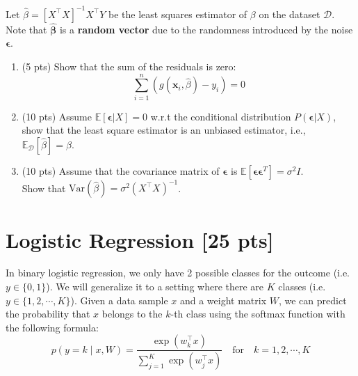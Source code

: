 \documentclass[11pt]{article}
\renewcommand{\vec}[1]{\mathbf{#1}}
\begin{document}
Let $\hat{\beta}=[X^\top X]^{-1}X^\top Y$ be the least squares estimator of $\beta$ on the dataset $\mathcal{D}$. Note that $\hat{\vec{\beta}}$ is a \textbf{random vector} due to the randomness introduced by the noise $\boldsymbol{\epsilon}$.
\begin{enumerate}
\item (5 pts) Show that the sum of the residuals is zero:
\[\sum_{i=1}^n(g(\mathbf{x}_i, \hat{\beta}) -y_i)=0\]

\begin{answertext}{6cm}{}

\end{answertext} 
\pagebreak
\item (10 pts)  Assume  $\mathbb{E}[\boldsymbol{\epsilon}|X]=0$ w.r.t the conditional distribution $P(\boldsymbol{\epsilon}|X)$, show that the least square estimator is an unbiased estimator, i.e., $\mathbb{E}_{\mathcal{D}}[\hat{\beta}]=\beta$.

\begin{answertext}{9cm}{}

\end{answertext} 
\item (10 pts) Assume that the covariance matrix of $\boldsymbol{\epsilon}$ is $\mathbb{E}\left[\boldsymbol{\epsilon} \boldsymbol{\epsilon}^T\right]=\sigma^2 I$.\\ Show that $\textrm{Var}(\hat{\beta})=\sigma^2\left(X^\top X\right)^{-1}$.

\begin{answertext}{9cm}{}

\end{answertext} 




\end{enumerate}

\pagebreak
\section{Logistic Regression [25 pts]}
In binary logistic regression, we only have 2 possible classes for the outcome (i.e. $y\in\{0,1\}$). We will generalize it to a setting where there are $K$ classes (i.e. $y\in\{1,2,\cdots,K\}$). Given a data sample $x$ and a weight matrix $W$, we can predict the probability that $x$ belongs to the $k$-th class using the softmax function with the following formula:
\[
p(y=k\mid x,W)=\frac{\exp(w_k^\top x)}{\sum_{j=1}^K\exp(w_j^\top x)}\quad\text{for}\quad k=1,2,\cdots,K
\]
\end{document}
